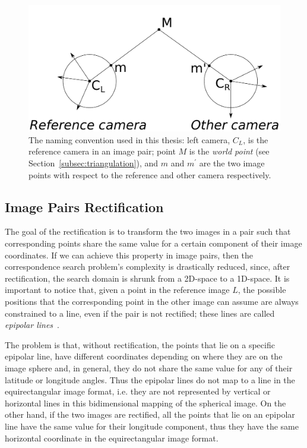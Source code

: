 \begin{figure}
	\centering
	\includegraphics[width=\linewidth]{img/naming_convention.pdf}
	\caption{The naming convention used in this thesis: left camera, $C_L$,
	is the reference camera in an image pair; point $M$ is the
	\emph{world point} (see Section~\ref{subsec:triangulation}),
	and $m$ and $m^\prime$ are the two image points with respect to
	the reference and other camera respectively.}
	\label{fig:naming_convention}
\end{figure}
%
\subsection{Image Pairs Rectification}
\label{subsec:rectification}
The goal of the rectification is to transform the two images in a pair such that
corresponding points share the same value for a certain component of their
image coordinates. If we can achieve this property in image pairs, then the
correspondence search problem's complexity is drastically reduced, since,
after rectification, the search domain is shrunk from a
2D-space to a 1D-space.
It is important to notice that, given a point in the reference image $L$,
the possible positions that the corresponding point in the other image can
assume are always constrained to a line, even if the pair is not
rectified; these lines are called
\emph{epipolar lines}~\cite{Hartley2004,szeliski2010computer}.

The problem is that, without rectification, the points that lie on a specific
epipolar line, have different coordinates depending on where they are on the
image sphere and, in general, they do not share the same value for any of their 
latitude or longitude angles. Thus the epipolar lines do not map to a line in
the equirectangular image format, i.e. they are not represented by vertical or 
horizontal lines in this bidimensional mapping of the spherical image.
On the other hand, if the two images are rectified, all the points that lie
on an epipolar line have the same value for their longitude component, thus
they have the same horizontal coordinate in the equirectangular image format.

